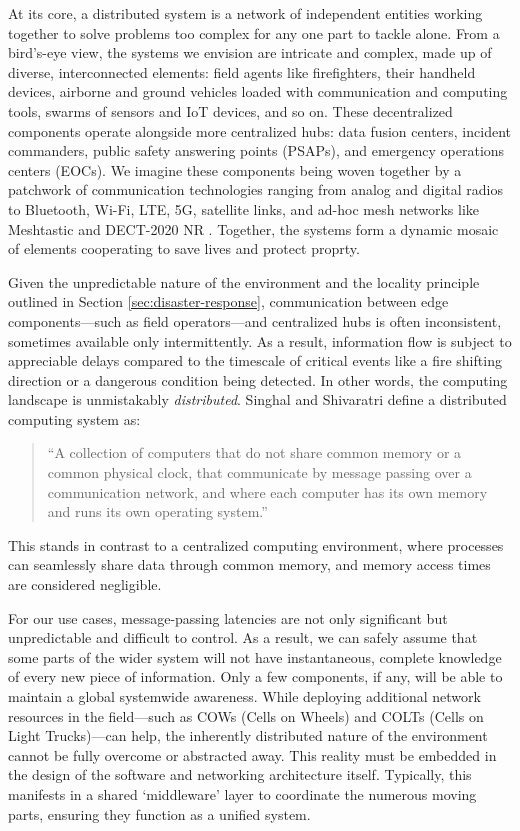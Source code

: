 \documentclass[]             %
{NASA}                       %
\theoremstyle{definition}
\begin{document}
At its core, a distributed system is a network of independent entities
working together to solve problems too complex for any one part to
tackle alone. From a bird’s-eye view, the systems we envision are
intricate and complex, made up of diverse, interconnected elements:
field agents like firefighters, their handheld devices, airborne and
ground vehicles loaded with communication and computing tools, swarms
of sensors and IoT devices, and so on. These decentralized components
operate alongside more centralized hubs: data fusion centers, incident
commanders, public safety answering points (PSAPs), and emergency
operations centers (EOCs). We imagine these components being woven
together by a patchwork of communication technologies ranging from
analog and digital radios to Bluetooth, Wi-Fi, LTE, 5G, satellite
links, and ad-hoc mesh networks like Meshtastic \citationneeded and
DECT-2020 NR \citationneeded. Together, the systems form a dynamic
mosaic of elements cooperating to save lives and protect proprty.

Given the unpredictable nature of the environment and the locality
principle outlined in Section \ref{sec:disaster-response},
communication between edge components---such as field operators---and
centralized hubs is often inconsistent, sometimes available only
intermittently. As a result, information flow is subject to
appreciable delays compared to the timescale of critical events like a
fire shifting direction or a dangerous condition being detected. In
other words, the computing landscape is unmistakably
\emph{distributed}. Singhal and Shivaratri \cite{10.5555/562065}
define a distributed computing system as:
\begin{quote}
  ``A collection of computers that do not share common
  memory or a common physical clock, that communicate by message
  passing over a communication network, and where each computer has
  its own memory and runs its own operating system.''
\end{quote}
This stands in contrast to a centralized computing environment, where
processes can seamlessly share data through common memory, and memory
access times are considered negligible.

For our use cases, message-passing latencies are not only significant
but unpredictable and difficult to control. As a result, we can safely
assume that some parts of the wider system will not have
instantaneous, complete knowledge of every new piece of
information. Only a few components, if any, will be able to maintain a
global systemwide awareness. While deploying additional network
resources in the field—such as COWs (Cells on Wheels) and COLTs (Cells
on Light Trucks)—can help, the inherently distributed nature of the
environment cannot be fully overcome or abstracted away. This reality
must be embedded in the design of the software and networking
architecture itself. Typically, this manifests in a shared
`middleware' layer to coordinate the numerous moving parts, ensuring
they function as a unified system.
\end{document}
